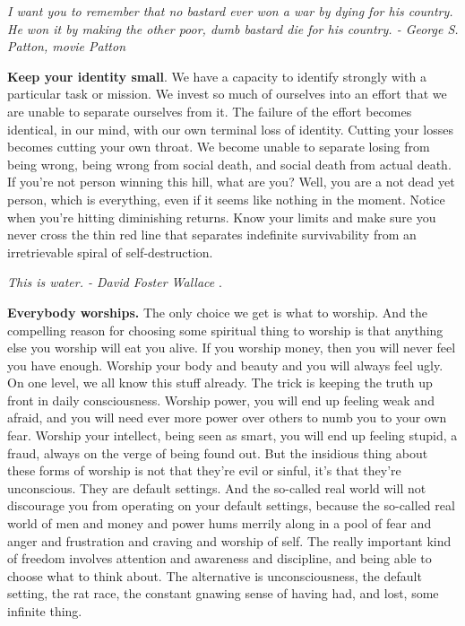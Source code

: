 \documentclass[a4paper,hidelinks]{article}
\begin{document}
\begin{center}
\textit{
I want you to remember that no bastard ever won a war by dying for his country. He won it by making the other poor, dumb bastard die for his country. - George S. Patton, movie Patton
}
\end{center}

\textbf{Keep your identity small}.
We have a capacity to identify strongly with a particular task or mission.
We invest so much of ourselves into an effort that we are unable to separate ourselves from it.
The failure of the effort becomes identical, in our mind, with our own terminal loss of identity.
Cutting your losses becomes cutting your own throat.
We become unable to separate losing from being wrong, being wrong from social death, and social death from actual death.
If you're not person winning this hill, what are you? Well, you are a not dead yet person, which is everything, even if it seems like nothing in the moment.
Notice when you're hitting diminishing returns.
Know your limits and make sure you never cross the thin red line that separates indefinite survivability from an irretrievable spiral of self-destruction.

\newpage

\begin{center}
\textit{
This is water. - David Foster Wallace
}.
\end{center}

\textbf{Everybody worships.} The only choice we get is what to worship.
And the compelling reason for choosing some spiritual thing to worship is that anything else you worship will eat you alive.
If you worship money, then you will never feel you have enough.
Worship your body and beauty and you will always feel ugly.
On one level, we all know this stuff already.
The trick is keeping the truth up front in daily consciousness.
Worship power, you will end up feeling weak and afraid, and you will need ever more power over others to numb you to your own fear.
Worship your intellect, being seen as smart, you will end up feeling stupid, a fraud, always on the verge of being found out.
But the insidious thing about these forms of worship is not that they’re evil or sinful, it’s that they’re unconscious.
They are default settings.
And the so-called real world will not discourage you from operating on your default settings, because the so-called real world of men and money and power hums merrily along in a pool of fear and anger and frustration and craving and worship of self.
The really important kind of freedom involves attention and awareness and discipline, and being able to choose what to think about.
The alternative is unconsciousness, the default setting, the rat race, the constant gnawing sense of having had, and lost, some infinite thing.
\end{document}
